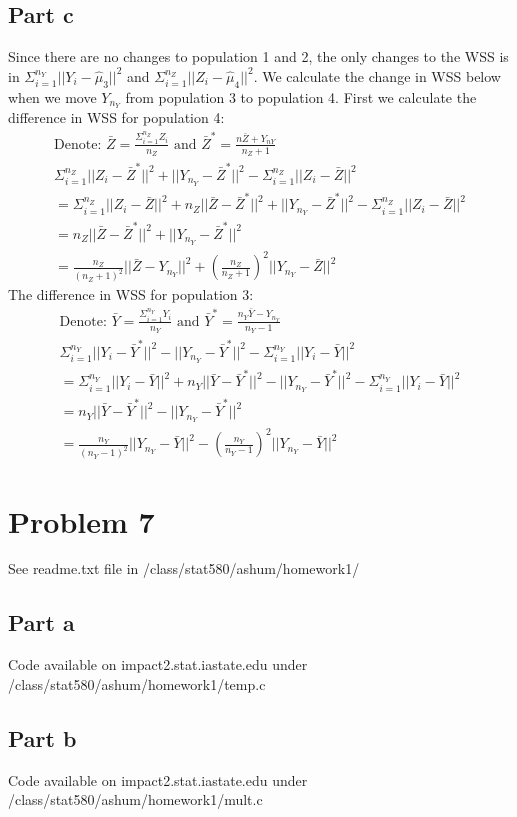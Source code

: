 \documentclass{article}\usepackage[]{graphicx}\usepackage[]{color}
\begin{document}
\subsection*{Part c}
Since there are no changes to population 1 and 2, the only changes to the WSS is in $\Sigma_{i=1}^{n_Y}||Y_i - \hat{\mu}_3||^2$ and $\Sigma_{i=1}^{n_Z}||Z_i - \hat{\mu}_4||^2$.  We calculate the change in WSS below when we move $Y_{n_Y}$ from population 3 to population 4.  First we calculate the difference in WSS for population 4:
\begin{align*}
\text{Denote: } \bar{Z} = \frac{\Sigma_{i=1}^{n_Z}Z_i}{n_Z} \text{ and } \bar{Z}^* = \frac{n\bar{Z} + Y_{nY}}{n_Z + 1} \\ 
\Sigma_{i=1}^{n_Z}||Z_i - \bar{Z}^*||^2 + ||Y_{n_Y} - \bar{Z}^*||^2 - \Sigma_{i=1}^{n_Z}||Z_i - \bar{Z}||^2\\
= \Sigma_{i=1}^{n_Z}||Z_i - \bar{Z}||^2 + n_{Z}||\bar{Z} - \bar{Z}^*||^2 + ||Y_{n_Y} - \bar{Z}^*||^2 - \Sigma_{i=1}^{n_Z}||Z_i - \bar{Z}||^2\\
= n_{Z}||\bar{Z} - \bar{Z}^*||^2 + ||Y_{n_Y} - \bar{Z}^*||^2\\
= \frac{n_Z}{(n_Z + 1)^2}||\bar{Z} - Y_{n_Y}||^2 + (\frac{n_Z}{n_Z + 1})^2 ||Y_{n_Y} - \bar{Z}||^2
\end{align*}
The difference in WSS for population 3:
\begin{align*}
\text{Denote: } \bar{Y} = \frac{\Sigma_{i=1}^{n_Y}Y_i}{n_Y} \text{ and }\bar{Y}^* = \frac{n_Y \bar{Y} - Y_{n_Y}}{n_Y - 1}\\
\Sigma_{i=1}^{n_Y}||Y_i - \bar{Y}^*||^2 - ||Y_{n_Y} - \bar{Y}^*||^2 - \Sigma_{i=1}^{n_Y}||Y_i - \bar{Y}||^2 \\
= \Sigma_{i=1}^{n_Y}||Y_i - \bar{Y}||^2 + n_Y||\bar{Y} - \bar{Y}^*||^2 - ||Y_{n_Y} - \bar{Y}^*||^2 - \Sigma_{i=1}^{n_Y}||Y_i - \bar{Y}||^2\\
= n_Y||\bar{Y} - \bar{Y}^*||^2 - ||Y_{n_Y} - \bar{Y}^*||^2 \\
= \frac{n_Y}{(n_Y - 1)^2}||Y_{n_Y} - \bar{Y}||^2 - (\frac{n_Y}{n_Y - 1})^2 ||Y_{n_Y} - \bar{Y}||^2
\end{align*}

\section*{Problem 7}
See readme.txt file in /class/stat580/ashum/homework1/
\subsection*{Part a}
Code available on impact2.stat.iastate.edu under /class/stat580/ashum/homework1/temp.c
\subsection*{Part b}
Code available on impact2.stat.iastate.edu under /class/stat580/ashum/homework1/mult.c
\end{document}
